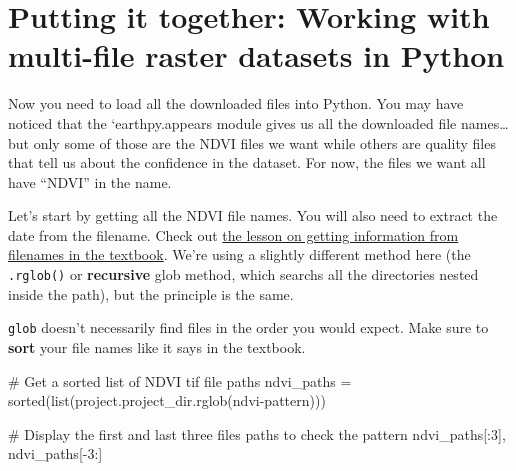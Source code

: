 \documentclass[
  letterpaper,
  DIV=11,
  numbers=noendperiod,
  oneside]{scrreprt}
\newenvironment{Shaded}{\begin{snugshade}}{\end{snugshade}}
\newcommand{\BuiltInTok}[1]{\textcolor[rgb]{0.00,0.23,0.31}{#1}}
\newcommand{\CommentTok}[1]{\textcolor[rgb]{0.37,0.37,0.37}{#1}}
\newcommand{\DecValTok}[1]{\textcolor[rgb]{0.68,0.00,0.00}{#1}}
\newcommand{\NormalTok}[1]{\textcolor[rgb]{0.00,0.23,0.31}{#1}}
\newcommand{\OperatorTok}[1]{\textcolor[rgb]{0.37,0.37,0.37}{#1}}
\newcommand{\StringTok}[1]{\textcolor[rgb]{0.13,0.47,0.30}{#1}}
\begin{document}
\section{Putting it together: Working with multi-file raster datasets in
Python}\label{putting-it-together-working-with-multi-file-raster-datasets-in-python}

Now you need to load all the downloaded files into Python. You may have
noticed that the `earthpy.appears module gives us all the downloaded
file names\ldots but only some of those are the NDVI files we want while
others are quality files that tell us about the confidence in the
dataset. For now, the files we want all have ``NDVI'' in the name.

Let's start by getting all the NDVI file names. You will also need to
extract the date from the filename. Check out
\href{https://www.earthdatascience.org/courses/intro-to-earth-data-science/write-efficient-python-code/loops/data-workflows-with-loops/}{the
lesson on getting information from filenames in the textbook}. We're
using a slightly different method here (the \texttt{.rglob()} or
\textbf{recursive} glob method, which searchs all the directories nested
inside the path), but the principle is the same.

\begin{tcolorbox}[enhanced jigsaw, colbacktitle=quarto-callout-caution-color!10!white, opacityback=0, bottomtitle=1mm, toptitle=1mm, bottomrule=.15mm, left=2mm, colframe=quarto-callout-caution-color-frame, leftrule=.75mm, opacitybacktitle=0.6, colback=white, rightrule=.15mm, toprule=.15mm, breakable, titlerule=0mm, title=\textcolor{quarto-callout-caution-color}{\faFire}\hspace{0.5em}{GOTCHA ALERT!}, coltitle=black, arc=.35mm]

\texttt{glob} doesn't necessarily find files in the order you would
expect. Make sure to \textbf{sort} your file names like it says in the
textbook.

\end{tcolorbox}

\begin{Shaded}
\begin{Highlighting}[]
\CommentTok{\# Get a sorted list of NDVI tif file paths}
\NormalTok{ndvi\_paths }\OperatorTok{=} \BuiltInTok{sorted}\NormalTok{(}\BuiltInTok{list}\NormalTok{(project.project\_dir.rglob(}\StringTok{\textquotesingle{}ndvi{-}pattern\textquotesingle{}}\NormalTok{)))}

\CommentTok{\# Display the first and last three files paths to check the pattern}
\NormalTok{ndvi\_paths[:}\DecValTok{3}\NormalTok{], ndvi\_paths[}\OperatorTok{{-}}\DecValTok{3}\NormalTok{:]}
\end{Highlighting}
\end{Shaded}
\end{document}
